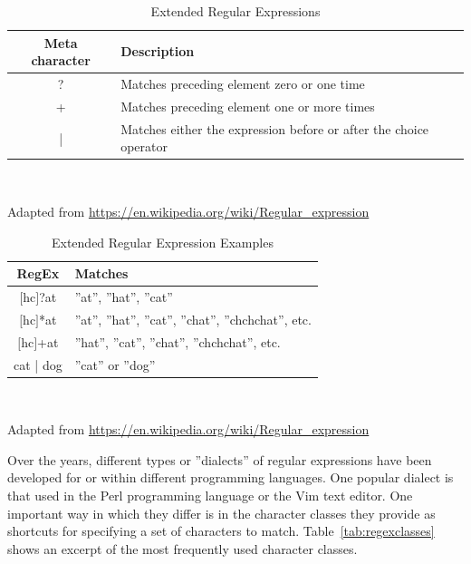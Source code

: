 \begin{advanced}
\begin{table}
\small
\centering

\renewcommand{\arraystretch}{1.25}
\begin{tabularx}{\textwidth}{c|X} \hline
{\bf Meta character} & {\bf Description} \\ \hline \hline
? & Matches preceding element zero or one time \\ \hline
+ & Matches preceding element one or more times \\ \hline
| & Matches either the expression before or after the choice operator \\ \hline
\end{tabularx} \\
\vspace{.5\baselineskip}

{\footnotesize Adapted from \url{https://en.wikipedia.org/wiki/Regular_expression}}

\caption{Extended Regular Expressions}
\label{tab:regexex}
\end{table}

\begin{table}
\small
\centering
\renewcommand{\arraystretch}{1.25}

\begin{tabularx}{\textwidth}{c|X} \hline
{\bf RegEx} & {\bf Matches} \\ \hline \hline
$[$hc$]$?at & ''at'', ''hat'', ''cat'' \\ \hline
$[$hc$]$*at & ''at'', ''hat'', ''cat'', ''chat'', ''chchchat'', etc. \\ \hline
$[$hc$]$+at & ''hat'', ''cat'', ''chat'', ''chchchat'', etc. \\ \hline
cat | dog & ''cat'' or ''dog'' \\ \hline
\end{tabularx}  \\
\vspace{.5\baselineskip}

{\footnotesize Adapted from \url{https://en.wikipedia.org/wiki/Regular_expression}} 

\caption{Extended Regular Expression Examples}
\label{tab:regexexexamples}
\end{table}

Over the years, different types or ''dialects'' of regular expressions have been developed for or within different programming languages. One popular dialect is that used in the Perl programming language or the Vim text editor. One important way in which they differ is in the character classes they provide as shortcuts for specifying a set of characters to match. Table~\ref{tab:regexclasses} shows an excerpt of the most frequently used character classes. 


\end{advanced}
